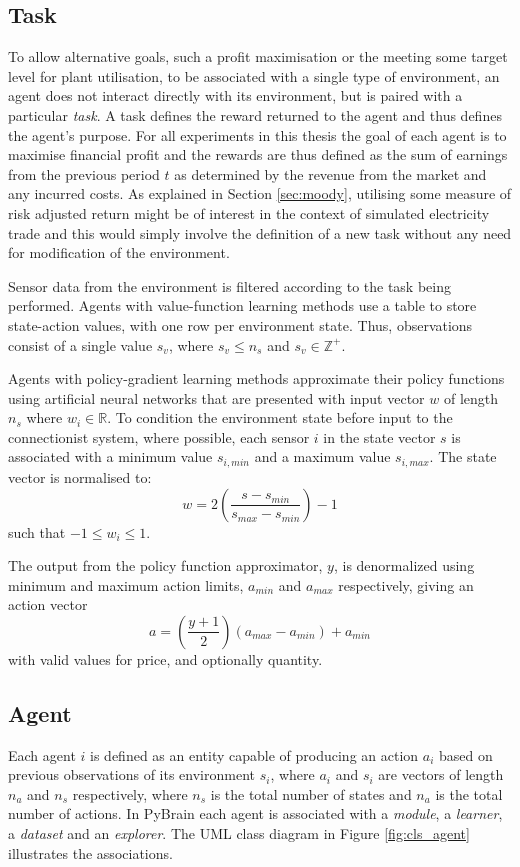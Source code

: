 \subsection{Task}
To allow alternative goals, such a profit maximisation or the meeting some
target level for plant utilisation, to be associated with a single type of
environment, an agent does not interact directly with its environment, but is paired with a particular \textit{task}. A task defines the
reward returned to the agent and thus defines the agent's purpose.  For all
experiments in this thesis the goal of each agent is to maximise
financial profit and the rewards are thus defined as the sum of earnings from
the previous period $t$ as determined by the revenue from the market and any
incurred costs.  As explained in Section \ref{sec:moody}, utilising some
measure of risk adjusted return might be of interest in the context of
simulated electricity trade and this would simply involve the definition of a
new task without any need for modification of the environment.

Sensor data from the environment is filtered according to the task
being performed.  Agents with value-function learning methods use a table to
store state-action values, with one row per environment state.  Thus, observations
consist of a single value $s_v$, where $s_v \leq n_s$ and $s_v \in
\mathbb{Z}^+$.

Agents with policy-gradient learning methods approximate their policy
functions using artificial neural networks that are presented with input vector
$w$ of length $n_s$ where $w_i \in \mathbb{R}$.  To condition
the environment state before input to the connectionist system, where possible,
each sensor $i$ in the state vector $s$ is associated with a minimum value
$s_{i,min}$ and a maximum value $s_{i,max}$.   The state vector is normalised
to:
\begin{equation}
w = 2\left(\frac{s - s_{min}}{s_{max} - s_{min}}\right) - 1
\end{equation}
such that $-1 \leq w_i \leq 1$.

The output from the policy function approximator, $y$, is denormalized using
minimum and maximum action limits, $a_{min}$ and $a_{max}$ respectively, giving
an action vector
\begin{equation}
a = \left(\frac{y + 1}{2}\right)(a_{max} - a_{min}) + a_{min}
\end{equation}
with valid values for price, and optionally quantity.

\subsection{Agent}
Each agent $i$ is defined as an entity capable of producing an action $a_i$
based on previous observations of its environment $s_i$, where $a_i$ and $s_i$
are vectors of length $n_a$ and $n_s$ respectively, where
$n_s$ is the total number of states and $n_a$ is the total number of actions.
In PyBrain each agent is associated with a \textit{module}, a \textit{learner},
a \textit{dataset} and an \textit{explorer}.  The UML class diagram in Figure
\ref{fig:cls_agent} illustrates the associations.

